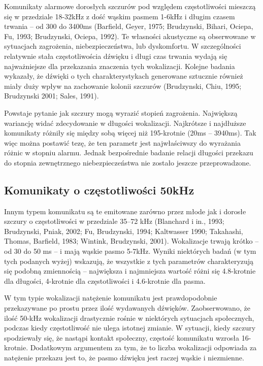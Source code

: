 \documentclass{psychol}
\begin{document}
Komunikaty alarmowe dorosłych szczurów pod względem częstotliwości mieszczą się w przedziale 18-32kHz z dość wąskim pasmem 1-6kHz i długim czasem trwania -- od 300 do 3400ms (Barfield, Geyer, 1975; Brudzynski, Bihari, Ociepa, Fu, 1993; Brudzynski, Ociepa, 1992). Te własności akustyczne są obserwowane w sytuacjach zagrożenia, niebezpieczeństwa, lub dyskomfortu. W szczególności relatywnie stała częstotliwościa dźwięku i długi czas trwania wydają się najważniejsze dla przekazania znaczenia tych wokalizacji. Kolejne badania wykazały, że dźwięki o tych charakterystykach generowane sztucznie również miały duży wpływ na zachowanie kolonii szczurów (Brudzynski, Chiu, 1995; Brudzynski 2001; Sales, 1991).

Powstaje pytanie jak szczury mogą wyrazić stopień zagrożenia. Największą wariancję widać zdecydowanie w długości wokalizacji. Najkrótsze i najdłuższe komunikaty różniły się między sobą więcej niż 195-krotnie (20ms -- 3940ms). Tak więc można postawić tezę, że ten parametr jest najwłaściwszy do wyrażania różnic w stopniu alarmu. Jednak bezpośrednie badanie relacji długości przekazu do stopnia zewnętrznego niebezpieczeństwa nie zostało jeszcze przeprowadzone. 

\subsection{Komunikaty o częstotliwości 50kHz}

Innym typem komunikatu są te emitowane zarówno przez młode jak i dorosłe szczury o częstotliwości w przedziale 35–72 kHz (Blanchard i in., 1993; Brudzynski, Pniak, 2002; Fu, Brudzynski, 1994; Kaltwasser 1990; Takahashi, Thomas, Barfield, 1983; Wintink, Brudzynski, 2001). Wokalizacje trwają krótko -- od 30 do 50 ms -- i mają wąskie pasmo 5-7kHz. Wyniki niektórych badań (w tym tych podanych wyżej) wskazują, że wszystkie z tych parametrów charakteryzują się podobną zmiennością -- największa i najmniejsza wartość różni się 4.8-krotnie dla długości, 4-krotnie dla częstotliwości i 4.6-krotnie dla pasma.

W tym typie wokalizacji natężenie komunikatu jest prawdopodobnie przekazywane po prostu przez ilość wydawanych dźwięków. Zaobserwowano, że ilość 50-kHz wokalizacji drastycznie rośnie w niektórych sytuacjach społecznych, podczas kiedy częstotliwość nie ulega istotnej zmianie. W sytuacji, kiedy szczury spodziewały się, że nastąpi kontakt społeczny, częstość komunikatu wzrosła 16-krotnie. Dodatkowym argumentem za tym, że to liczba wokalizacji odpowiada za natężenie przekazu jest to, że pasmo dźwięku jest raczej wąskie i niezmienne.
\end{document}
